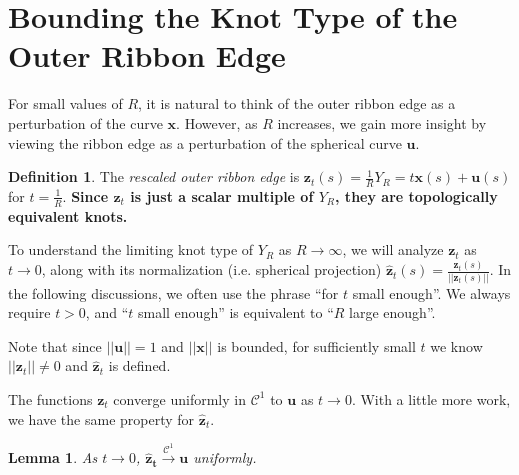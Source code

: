 \documentclass[12pt]{article}
\numberwithin{equation}{subsection}
\newtheorem{lem}{Lemma}[thm]
\theoremstyle{definition}
\newtheorem*{defin}{Definition}
\numberwithin{lem}{section}
\def\uu{\mathbf{u}}
\def\zz{\mathbf{z}}
\def\zhat{\mathbf{\hat{z}}}
\def\C{\mathcal{C}}
\begin{document}
\section{Bounding the Knot Type of the Outer Ribbon Edge}
\label{sec:bound}

For small values of $R$, it is natural to think of the outer ribbon edge as a perturbation of the curve $\mathbf{x}$.  However, as $R$ increases, we gain more insight by viewing the ribbon edge as a perturbation of the spherical curve $\uu$.


\begin{defin}
The \emph{rescaled outer ribbon edge} is  $\zz_t(s) = \frac{1}{R} Y_R = t\mathbf{x}(s) + \uu(s)$ for $t = \frac{1}{R}$.  
{\bf {Since $\zz_t$ is just a scalar multiple of $Y_R$, they are topologically equivalent knots.}} 

To understand the limiting knot type of $Y_R$ as $R \to \infty$, we will analyze $\zz_t$ as $t \to 0$, along with  its normalization (i.e. spherical projection)   
$\zhat_t(s) = \frac{\zz_t(s)}{||\zz_t(s)||}$.  In the following discussions, we often use the phrase ``for $t$ small enough''.  We always require $t>0$, and ``$t$ small enough'' is equivalent to ``$R$ large enough''.

Note that since $||\uu||=1$ and $||\mathbf{x}||$ is bounded, for sufficiently small $t$ we know $||\zz_t|| \neq 0$  and $\zhat_t$ is defined. 
\end{defin}

The functions $\zz_t$ converge uniformly in $\C^1$ to $\uu$ as $t \to 0$. With a little more work, we have the same property for $\zhat_t$. 

\begin{lem}
\label{lem:convergence}
As $t \rightarrow 0$, $\mathbf{\hat{z}_t} \xrightarrow{\C^1} \uu$ uniformly.
\end{lem}
\end{document}
